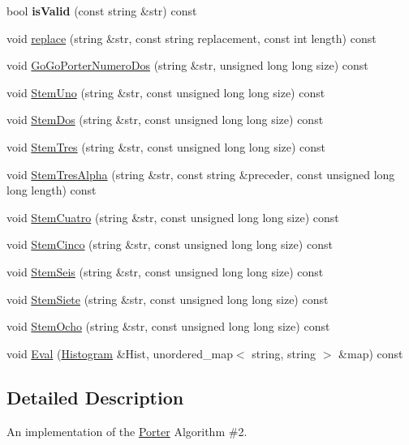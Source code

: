 \begin{DoxyCompactItemize}
\mbox{\label{classPorter_a9da79dd6524131e703619d3e301e896a}} 
bool {\bfseries is\+Valid} (const string \&str) const
\item 
void \hyperlink{classPorter_aba12641d0e612b264097a35e4f2ffb45}{replace} (string \&str, const string replacement, const int length) const
\item 
void \hyperlink{classPorter_af7f1d6892ca1ed4e22986c48be2365d6}{Go\+Go\+Porter\+Numero\+Dos} (string \&str, unsigned long long size) const
\item 
void \hyperlink{classPorter_ad8b63c9741655393ff9c849d269c953a}{Stem\+Uno} (string \&str, const unsigned long long size) const
\item 
void \hyperlink{classPorter_a33838d3b5ab4963106a5c47c4a0c74e6}{Stem\+Dos} (string \&str, const unsigned long long size) const
\item 
void \hyperlink{classPorter_a4aadb1440bc5f143aba28641cab26ff6}{Stem\+Tres} (string \&str, const unsigned long long size) const
\item 
void \hyperlink{classPorter_ac5e4f3909a27316c6997c92a0019eaaf}{Stem\+Tres\+Alpha} (string \&str, const string \&preceder, const unsigned long long length) const
\item 
void \hyperlink{classPorter_aa1e1b416311f37b827bc093bb03ca500}{Stem\+Cuatro} (string \&str, const unsigned long long size) const
\item 
void \hyperlink{classPorter_a916f45b55a1bbdaff7ce1db3d9a42813}{Stem\+Cinco} (string \&str, const unsigned long long size) const
\item 
void \hyperlink{classPorter_a485f69d6797fce65144e0596f3190c2d}{Stem\+Seis} (string \&str, const unsigned long long size) const
\item 
void \hyperlink{classPorter_a1015f959403c55d740fff435f0cae439}{Stem\+Siete} (string \&str, const unsigned long long size) const
\item 
void \hyperlink{classPorter_a61853073641e47863fc6a85c786d8737}{Stem\+Ocho} (string \&str, const unsigned long long size) const
\item 
void \hyperlink{classPorter_afbe6ae10a924a4419e62a20babe3be7d}{Eval} (\hyperlink{classHistogram}{Histogram} \&Hist, unordered\+\_\+map$<$ string, string $>$ \&map) const
\end{DoxyCompactItemize}


\subsection{Detailed Description}
An implementation of the \hyperlink{classPorter}{Porter} Algorithm \#2. 

